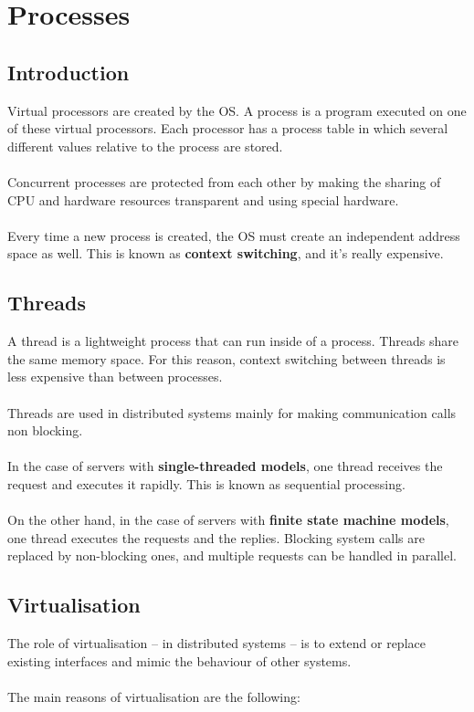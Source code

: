 \documentclass{article}
\begin{document}
\section{Processes}
\subsection{Introduction}
Virtual processors are created by the OS. A process is a program executed on one of these virtual processors. Each processor has a process table in which several different values relative to the process are stored. \\ \\
Concurrent processes are protected from each other by making the sharing of CPU and hardware resources transparent and using special hardware. \\ \\
Every time a new process is created, the OS must create an independent address space as well. This is known as \textbf{context switching}, and it's really expensive.

\subsection{Threads}
A thread is a lightweight process that can run inside of a process. Threads share the same memory space. For this reason, context switching between threads is less expensive than between processes. \\ \\
Threads are used in distributed systems mainly for making communication calls non blocking. \\ \\
In the case of servers with \textbf{single-threaded models}, one thread receives the request and executes it rapidly. This is known as sequential processing. \\ \\
On the other hand, in the case of servers with \textbf{finite state machine models}, one thread executes the requests and the replies. Blocking system calls are replaced by non-blocking ones, and multiple requests can be handled in parallel.

\subsection{Virtualisation}
The role of virtualisation -- in distributed systems -- is to extend or replace existing interfaces and mimic the behaviour of other systems. \\ \\
The main reasons of virtualisation are the following:
\end{document}

